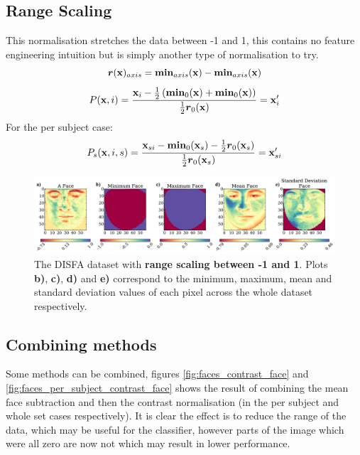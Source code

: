     \subsection{Range Scaling}
      This normalisation stretches the data between -1 and 1, this contains no feature engineering
      intuition but is simply another type of normalisation to try.
      \begin{equation}
        {\boldsymbol r}({\bf x})_{axis} = {\boldsymbol \min}_{axis}({\bf x}) - {\boldsymbol \min}_{axis}({\bf x})
      \end{equation}
      \begin{equation}
         P({\bf x},i) =
         \frac{{\bf x}_{i} - \frac{1}{2}\left ( {\boldsymbol \min}_0({\bf x}) + {\boldsymbol \min}_0({\bf x}) \right ) }{\frac{1}{2}{\boldsymbol r}_0({\bf x})}
         = {\bf x}_{i}'
      \end{equation}
      For the per subject case:
      \begin{equation}
         P_s({\bf x},i,s) =
         \frac{{\bf x}_{si} - {\boldsymbol \min}_0({\bf x}_s) - \frac{1}{2}{\boldsymbol r}_0({\bf x}_s) }{\frac{1}{2}{\boldsymbol r}_0({\bf x}_s)}
         = {\bf x}_{si}'
      \end{equation}
      \begin{figure}[!h] \centering
      \includegraphics[width =\hsize]{figures/faces_range.pdf}
      \caption{The DISFA dataset with {\bf range scaling between -1 and 1}.
      Plots {\bf b)}, {\bf c)}, {\bf d)} and {\bf e)} correspond to the minimum,
      maximum, mean and standard deviation values of each pixel across the whole
      dataset respectively.} \label{fig:simple} \end{figure}

    \subsection{Combining methods}
      Some methods can be combined, figures \ref{fig:faces_contrast_face} and \ref{fig:faces_per_subject_contrast_face}
      shows the result of combining the mean face subtraction and then the
      contrast normalisation (in the per subject and whole set cases respectively). It is clear the effect is to
      reduce the range of the data, which may be useful for the classifier, however parts of the image
      which were all zero are now not which may result in lower performance.

